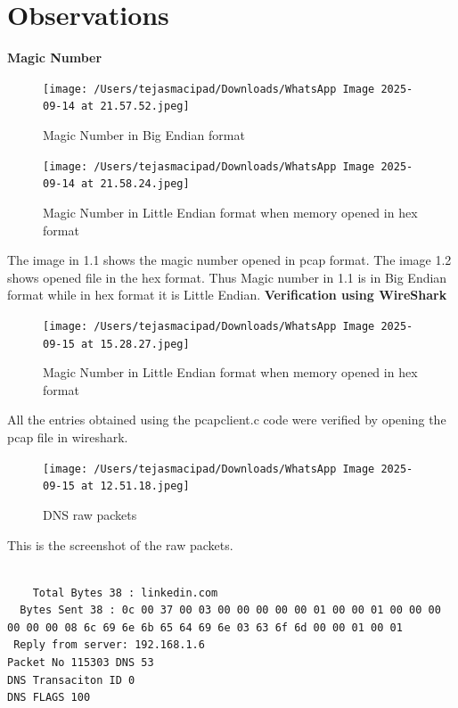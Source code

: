 \documentclass[12pt, a4paper]{report}
\begin{document}
\newpage
\section{Observations}

\textbf{Magic Number}

\begin{figure}[h!]
    \centering
    \texttt{[image: /Users/tejasmacipad/Downloads/WhatsApp Image 2025-09-14 at 21.57.52.jpeg]}
    \caption{Magic Number in Big Endian format}
    \label{fig:your-label}
\end{figure}

\begin{figure}[h!]
    \centering
    \texttt{[image: /Users/tejasmacipad/Downloads/WhatsApp Image 2025-09-14 at 21.58.24.jpeg]}
    \caption{Magic Number in Little Endian format when memory opened in hex format}
    \label{fig:your-label2}
\end{figure}

The image in 1.1 shows the magic number opened in pcap format. The image 1.2 shows opened file in the hex format. Thus Magic number in 1.1 is in Big Endian format while in hex format it is Little Endian.
\newpage
\textbf{Verification using WireShark}

\begin{figure}[h!]
    \centering
    \texttt{[image: /Users/tejasmacipad/Downloads/WhatsApp Image 2025-09-15 at 15.28.27.jpeg]}
    \caption{Magic Number in Little Endian format when memory opened in hex format}
    \label{fig:your-label4}
\end{figure}

All the entries obtained using the pcapclient.c code were verified by opening the pcap file in wireshark.

\begin{figure}[h!]
    \centering
    \texttt{[image: /Users/tejasmacipad/Downloads/WhatsApp Image 2025-09-15 at 12.51.18.jpeg]}
    \caption{DNS raw packets}
    \label{fig:your-label3}
\end{figure}

This is the screenshot of the raw packets.


\begin{lstlisting}[caption={Raw Packet analysis}]

    Total Bytes 38 : linkedin.com
  Bytes Sent 38 : 0c 00 37 00 03 00 00 00 00 00 01 00 00 01 00 00 00 00 00 00 08 6c 69 6e 6b 65 64 69 6e 03 63 6f 6d 00 00 01 00 01 
 Reply from server: 192.168.1.6
Packet No 115303 DNS 53
DNS Transaciton ID 0
DNS FLAGS 100 

\end{lstlisting}
\end{document}
